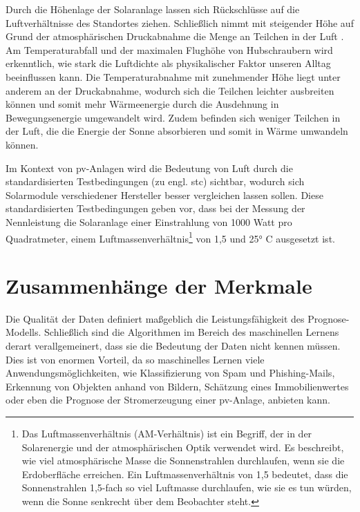 \documentclass[12pt, a4paper]{article}
\begin{document}
Durch die Höhenlage der Solaranlage lassen sich Rückschlüsse auf die Luftverhältnisse des Standortes ziehen. Schließlich nimmt mit steigender Höhe auf Grund der atmosphärischen Druckabnahme die Menge an Teilchen in der Luft \cite{ws:meteoschweiz}. Am Temperaturabfall und der maximalen Flughöhe von Hubschraubern wird erkenntlich, wie stark die Luftdichte als physikalischer Faktor unseren Alltag beeinflussen kann. Die Temperaturabnahme mit zunehmender Höhe liegt unter anderem an der Druckabnahme, wodurch sich die Teilchen leichter ausbreiten können und somit mehr Wärmeenergie durch die Ausdehnung in Bewegungsenergie umgewandelt wird. Zudem befinden sich weniger Teilchen in der Luft, die die Energie der Sonne absorbieren und somit in Wärme umwandeln können.


Im Kontext von \ac{pv}-Anlagen wird die Bedeutung von Luft durch die standardisierten Testbedingungen (zu engl. \ac{stc}) sichtbar, wodurch sich Solarmodule verschiedener Hersteller besser vergleichen lassen sollen. Diese standardisierten Testbedingungen geben vor, dass bei der Messung der Nennleistung die Solaranlage einer Einstrahlung von 1000 Watt pro Quadratmeter, einem Luftmassenverhältnis\footnote{Das Luftmassenverhältnis (AM-Verhältnis) ist ein Begriff, der in der Solarenergie und der atmosphärischen Optik verwendet wird. Es beschreibt, wie viel atmosphärische Masse die Sonnenstrahlen durchlaufen, wenn sie die Erdoberfläche erreichen. Ein Luftmassenverhältnis von 1,5 bedeutet, dass die Sonnenstrahlen 1,5-fach so viel Luftmasse durchlaufen, wie sie es tun würden, wenn die Sonne senkrecht über dem Beobachter steht.} von 1,5 und 25° C ausgesetzt ist.


\newpage

\section{Zusammenhänge der Merkmale}
\label{sec:features}

Die Qualität der Daten definiert maßgeblich die Leistungsfähigkeit des Prognose-Modells. Schließlich sind die Algorithmen im Bereich des maschinellen Lernens derart verallgemeinert, dass sie die Bedeutung der Daten nicht kennen müssen. Dies ist von enormen Vorteil, da so maschinelles Lernen viele Anwendungsmöglichkeiten, wie Klassifizierung von Spam und Phishing-Mails, Erkennung von Objekten anhand von Bildern, Schätzung eines Immobilienwertes oder eben die Prognose der Stromerzeugung einer \ac{pv}-Anlage, anbieten kann.
\end{document}
